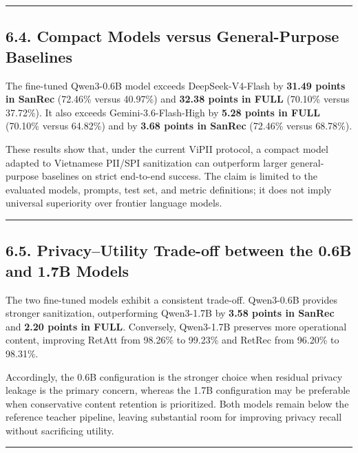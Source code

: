 \documentclass[
]{article}
\begin{document}
\begin{center}\rule{0.5\linewidth}{0.5pt}\end{center}

\subsection{6.4. Compact Models versus General-Purpose
Baselines}\label{compact-models-versus-general-purpose-baselines}

The fine-tuned Qwen3-0.6B model exceeds DeepSeek-V4-Flash by
\textbf{31.49 points in SanRec} (72.46\% versus 40.97\%) and
\textbf{32.38 points in FULL} (70.10\% versus 37.72\%). It also exceeds
Gemini-3.6-Flash-High by \textbf{5.28 points in FULL} (70.10\% versus
64.82\%) and by \textbf{3.68 points in SanRec} (72.46\% versus 68.78\%).

These results show that, under the current ViPII protocol, a compact
model adapted to Vietnamese PII/SPI sanitization can outperform larger
general-purpose baselines on strict end-to-end success. The claim is
limited to the evaluated models, prompts, test set, and metric
definitions; it does not imply universal superiority over frontier
language models.

\begin{center}\rule{0.5\linewidth}{0.5pt}\end{center}

\subsection{6.5. Privacy--Utility Trade-off between the 0.6B and 1.7B
Models}\label{privacyutility-trade-off-between-the-0.6b-and-1.7b-models}

The two fine-tuned models exhibit a consistent trade-off. Qwen3-0.6B
provides stronger sanitization, outperforming Qwen3-1.7B by \textbf{3.58
points in SanRec} and \textbf{2.20 points in FULL}. Conversely,
Qwen3-1.7B preserves more operational content, improving RetAtt from
98.26\% to 99.23\% and RetRec from 96.20\% to 98.31\%.

Accordingly, the 0.6B configuration is the stronger choice when residual
privacy leakage is the primary concern, whereas the 1.7B configuration
may be preferable when conservative content retention is prioritized.
Both models remain below the reference teacher pipeline, leaving
substantial room for improving privacy recall without sacrificing
utility.

\begin{center}\rule{0.5\linewidth}{0.5pt}\end{center}
\end{document}
